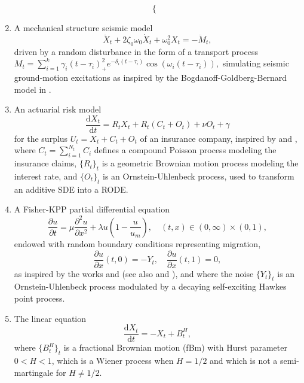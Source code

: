 \documentclass[reqno,12pt]{amsart}
\theoremstyle{plain} %
\theoremstyle{definition} %
\begin{document}
\begin{enumerate}
\begin{equation}
\begin{cases}
        \end{cases}
    \end{equation}
    \item A mechanical structure seismic model 
    \begin{equation}
        \label{eqearthquake}
        \ddot X_t + 2\zeta_0\omega_0\dot X_t + \omega_0^2 X_t = - \ddot M_t,
    \end{equation}
    driven by a random disturbance in the form of a transport process $M_t = \sum_{i=1}^k \gamma_i (t - \tau_i)_+^2 e^{-\delta_i (t - \tau_i)}\cos(\omega_i (t - \tau_i)),$ simulating seismic ground-motion excitations as inspired by the Bogdanoff-Goldberg-Bernard model in \cite{BogdanoffGoldbergBernard1961}.
    \item An actuarial risk model
    \begin{equation}
        \label{eqrisk}
        \frac{\mathrm{d}X_t}{\mathrm{d}t} = R_t X_t + R_t (C_t + O_t) + \nu O_t + \gamma
    \end{equation}
    for the surplus $U_t = X_t + C_t + O_t$ of an insurance company, inspired by \cite{GerberShiu1998} and \cite{BrigoMercurio2006}, where $C_t = \sum_{i=1}^{N_t} C_i$ defines a compound Poisson process modeling the insurance claims, $\{R_t\}_t$ is a geometric Brownian motion process modeling the interest rate, and $\{O_t\}_t$ is an Ornstein-Uhlenbeck process, used to transform an additive SDE into a RODE.
    \item A Fisher-KPP partial differential equation
    \begin{equation}
        \label{eqfisherkpp}
        \frac{\partial u}{\displaystyle \partial t} = \mu\frac{\partial^2 u}{\partial x^2} + \lambda u\left(1 - \frac{u}{u_m}\right), \quad (t, x) \in (0, \infty) \times (0, 1),
    \end{equation}
    endowed with random boundary conditions representing migration,
    \begin{equation}
        \label{eqfisherkppbcs}
        \frac{\partial u}{\partial x}(t, 0) = - Y_t, \quad \frac{\partial u}{\partial x}(t, 1) = 0,
    \end{equation}  
    as inspired by the works \cite{SalakoShen2020} and \cite{FreidlinWentzell1992} (see also \cite{Fisher1937} and \cite{KPP1937}), and where the noise $\{Y_t\}_t$ is an Ornstein-Uhlenbeck process modulated by a decaying self-exciting Hawkes point process.
    \item The linear equation
    \begin{equation}
        \label{eqlinearfbm}
        \frac{\mathrm{d}X_t}{\mathrm{d} t} = -X_t + B^H_t,
    \end{equation}
    where $\{B^H_t\}_t$ is a fractional Brownian motion (fBm) with Hurst parameter $0 < H < 1$, which is a Wiener process when $H=1/2$ and which is not a semi-martingale for $H\neq 1/2.$
\end{enumerate}
\end{document}
